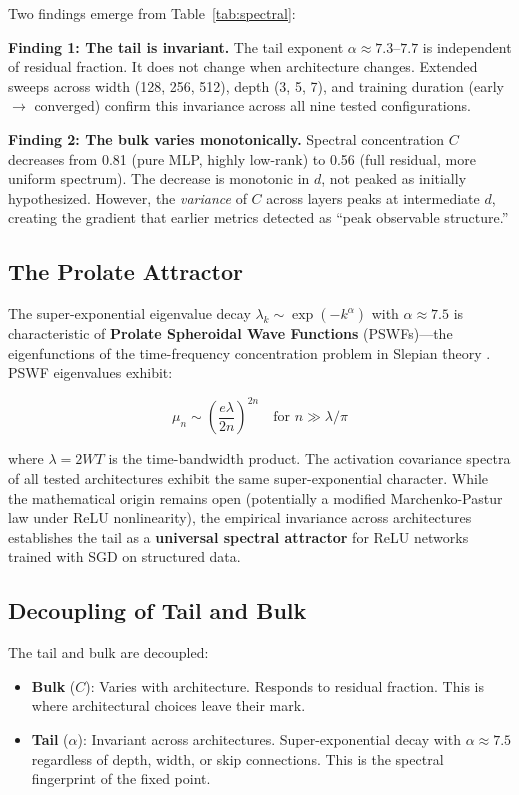 \documentclass[12pt,a4paper]{article}
\begin{document}
Two findings emerge from Table~\ref{tab:spectral}:

\textbf{Finding 1: The tail is invariant.} The tail exponent $\alpha \approx 7.3$--$7.7$ is independent of residual fraction. It does not change when architecture changes. Extended sweeps across width (128, 256, 512), depth (3, 5, 7), and training duration (early $\to$ converged) confirm this invariance across all nine tested configurations.

\textbf{Finding 2: The bulk varies monotonically.} Spectral concentration $C$ decreases from 0.81 (pure MLP, highly low-rank) to 0.56 (full residual, more uniform spectrum). The decrease is monotonic in $d$, not peaked as initially hypothesized. However, the \textit{variance} of $C$ across layers peaks at intermediate $d$, creating the gradient that earlier metrics detected as ``peak observable structure.''

\subsection{The Prolate Attractor}

The super-exponential eigenvalue decay $\lambda_k \sim \exp(-k^\alpha)$ with $\alpha \approx 7.5$ is characteristic of \textbf{Prolate Spheroidal Wave Functions} (PSWFs)---the eigenfunctions of the time-frequency concentration problem in Slepian theory \cite{slepian}. PSWF eigenvalues exhibit:

\begin{equation}
\mu_n \sim \left(\frac{e\lambda}{2n}\right)^{2n} \quad \text{for } n \gg \lambda/\pi
\end{equation}

where $\lambda = 2WT$ is the time-bandwidth product. The activation covariance spectra of all tested architectures exhibit the same super-exponential character. While the mathematical origin remains open (potentially a modified Marchenko-Pastur law under ReLU nonlinearity), the empirical invariance across architectures establishes the tail as a \textbf{universal spectral attractor} for ReLU networks trained with SGD on structured data.

\subsection{Decoupling of Tail and Bulk}

The tail and bulk are decoupled:
\begin{itemize}
    \item \textbf{Bulk} ($C$): Varies with architecture. Responds to residual fraction. This is where architectural choices leave their mark.
    \item \textbf{Tail} ($\alpha$): Invariant across architectures. Super-exponential decay with $\alpha \approx 7.5$ regardless of depth, width, or skip connections. This is the spectral fingerprint of the fixed point.
\end{itemize}
\end{document}
